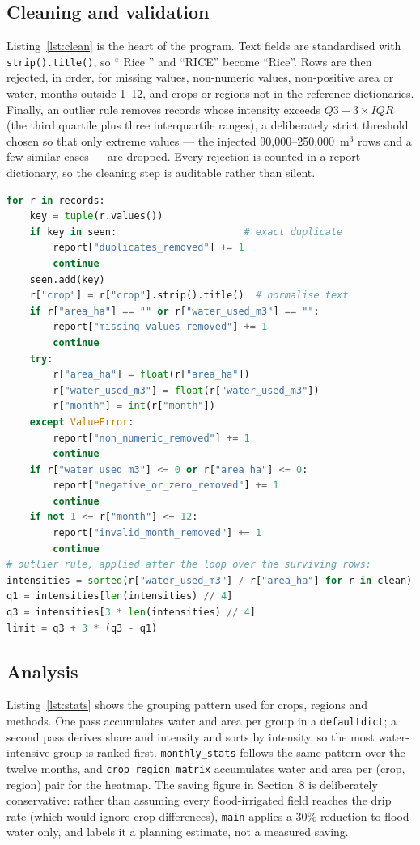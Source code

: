 \documentclass[11pt,a4paper]{article}
\begin{document}
\subsection{Cleaning and validation}
Listing~\ref{lst:clean} is the heart of the program. Text fields are standardised with
\texttt{strip().title()}, so `` Rice '' and ``RICE'' become ``Rice''. Rows are then
rejected, in order, for missing values, non-numeric values, non-positive area or water,
months outside 1--12, and crops or regions not in the reference dictionaries. Finally,
an outlier rule removes records whose intensity exceeds $Q3 + 3 \times IQR$ (the third
quartile plus three interquartile ranges), a deliberately strict threshold chosen so
that only extreme values --- the injected 90,000--250,000~m$^3$ rows and a few similar
cases --- are dropped. Every rejection is counted in a report dictionary, so the
cleaning step is auditable rather than silent.

\begin{lstlisting}[language=Python, caption={Cleaning and validation (extract from
  \texttt{clean\_data}; the full function is in the repository).},
  label={lst:clean}]
for r in records:
    key = tuple(r.values())
    if key in seen:                      # exact duplicate
        report["duplicates_removed"] += 1
        continue
    seen.add(key)
    r["crop"] = r["crop"].strip().title()  # normalise text
    if r["area_ha"] == "" or r["water_used_m3"] == "":
        report["missing_values_removed"] += 1
        continue
    try:
        r["area_ha"] = float(r["area_ha"])
        r["water_used_m3"] = float(r["water_used_m3"])
        r["month"] = int(r["month"])
    except ValueError:
        report["non_numeric_removed"] += 1
        continue
    if r["water_used_m3"] <= 0 or r["area_ha"] <= 0:
        report["negative_or_zero_removed"] += 1
        continue
    if not 1 <= r["month"] <= 12:
        report["invalid_month_removed"] += 1
        continue
# outlier rule, applied after the loop over the surviving rows:
intensities = sorted(r["water_used_m3"] / r["area_ha"] for r in clean)
q1 = intensities[len(intensities) // 4]
q3 = intensities[3 * len(intensities) // 4]
limit = q3 + 3 * (q3 - q1)
\end{lstlisting}

\subsection{Analysis}
Listing~\ref{lst:stats} shows the grouping pattern used for crops, regions and methods.
One pass accumulates water and area per group in a \texttt{defaultdict}; a second pass
derives share and intensity and sorts by intensity, so the most water-intensive group
is ranked first. \texttt{monthly\_stats} follows the same pattern over the twelve
months, and \texttt{crop\_region\_matrix} accumulates water and area per
(crop, region) pair for the heatmap. The saving figure in Section~8 is deliberately
conservative: rather than assuming every flood-irrigated field reaches the drip rate
(which would ignore crop differences), \texttt{main} applies a 30\% reduction to flood
water only, and labels it a planning estimate, not a measured saving.
\end{document}
